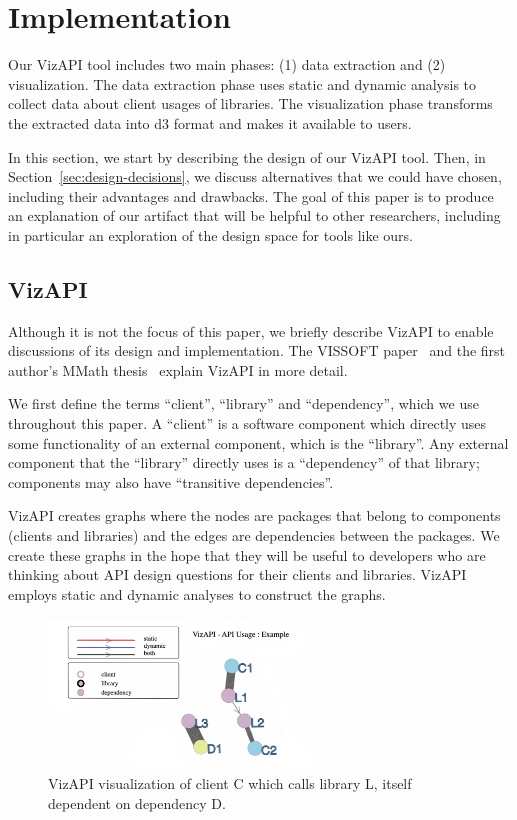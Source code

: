 \section{Implementation}
\label{sec:implementation}
Our VizAPI tool includes two main phases: (1) data extraction and (2)
visualization. The data extraction phase uses static and dynamic
analysis to collect data about client usages of libraries. The
visualization phase transforms the extracted data into d3 format and makes it
available to users.

In this section, we start by describing the design of our VizAPI
tool. Then, in Section~\ref{sec:design-decisions}, we discuss
alternatives that we could have chosen, including their advantages and
drawbacks.  The goal of this paper is to produce an explanation of our
artifact that will be helpful to other researchers, including in
particular an exploration of the design space for tools like ours.

\subsection{VizAPI}
Although it is not the focus of this paper, we briefly describe VizAPI
to enable discussions of its design and implementation.
The VISSOFT paper~\cite{venkatanarayanan22:_vizap}
and the first author's MMath thesis~\cite{venkatanarayanan22:_study_lever_api_usage_patter} explain VizAPI in more detail.

We first define the terms ``client'', ``library'' and ``dependency'', which we use throughout this paper. A ``client'' is a software component which directly uses some functionality of an external component, which is the ``library''. Any external component that the ``library'' directly uses is a ``dependency'' of that library; components may also have ``transitive dependencies''.

VizAPI creates graphs where the nodes are packages that belong to components (clients and libraries) and the edges are dependencies between the packages. We create these graphs in the hope that they will be useful to developers who are thinking about API design questions for their clients and libraries. VizAPI employs static and dynamic analyses to construct the graphs. 

\begin{figure}[h]
\begin{center}
\includegraphics[height=4cm,width=7cm]{images/intro-example.png}
\caption{VizAPI visualization of client C which calls library L, itself dependent on dependency D.}
\label{fig:example}
\end{center}
\end{figure}


